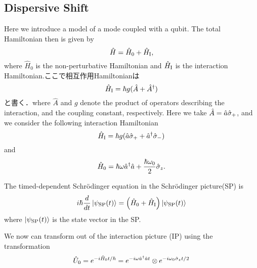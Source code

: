 \subsection{Dispersive Shift}
Here we introduce a model of a mode coupled with a qubit.
The total Hamiltonian then is given by 
\begin{equation}
    \hat{H} = \hat{H}_0 +\hat{H}_{\rm{I}},
\end{equation}
where $\hat{H}_0$ is the non-perturbative Hamiltonian and $\hat{H}_{\rm{I}}$ is the interaction Hamiltonian.ここで相互作用Hamiltonianは
\begin{equation}
    \hat{H}_{\rm{I}}=\hbar g(\hat{A}+\hat{A}^\dagger)
\end{equation}
と書く．where $\hat{A}$ and $g$ denote the product of operators describing the interaction, and the coupling constant, respectively.
Here we take $\hat{A}=\hat{a}{\hat{\sigma}}_+$, and we consider the following interaction Hamiltonian \begin{equation}
    \hat{H}_{\rm{I}}=\hbar g(\hat{a}{\hat{\sigma}}_+ + \hat{a}^\dagger{\hat{\sigma}}_-)
\end{equation}
and
\begin{equation}
    \hat{H}_{0}=\hbar\omega\hat{a}^\dagger\hat{a}+\frac{\hbar\omega_0}{2}{\hat{\sigma}}_z.
\end{equation}

The timed-dependent Schr\"{o}dinger equation in the Schr\"{o}dinger picture(SP) is
\begin{equation}
    i\hbar\frac{d}{dt}\ket{\psi_{\rm{SP}}(t)}
    =\left(
    \hat{H}_0+\hat{H}_{\rm{I}}
    \right)
    \ket{\psi_{\rm{SP}}(t)}
\end{equation}
where $\ket{\psi_{\rm{SP}}(t)}$ is the state vector in the SP.

We now can transform out of the interaction picture (IP) using the transformation
\begin{equation}
    {\hat{U}}_0=e^{-i\hat{H}_0 t/\hbar}
    =e^{-i\omega\hat{a}^{\dagger}\hat{a} t}\otimes
    e^{-i\omega_0{\hat{\sigma}}_z t/2}
\end{equation}

